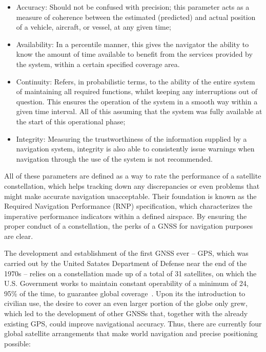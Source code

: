 \begin{itemize}
    \item Accuracy: Should not be confused with precision; this parameter acts as a measure of coherence between the estimated (predicted) and actual position of a vehicle, aircraft, or vessel, at any given time;
    \item Availability: In a percentile manner, this gives the navigator the ability to know the amount of time available to benefit from the services provided by the system, within a certain specified coverage area.
    \item Continuity: Refers, in probabilistic terms, to the ability of the entire system of maintaining all required functions, whilst keeping any interruptions out of question. This ensures the operation of the system in a smooth way within a given time interval. All of this assuming that the system was fully available at the start of this operational phase;
    \item Integrity: Measuring the trustworthiness of the information supplied by a navigation system, integrity is also able to consistently issue warnings when navigation through the use of the system is not recommended.
\end{itemize}
All of these parameters are defined as a way to rate the performance of a satellite constellation, which helps tracking down any discrepancies or even problems that might make accurate navigation unacceptable.
Their foundation is known as the Required Navigation Performance (RNP) specification, which characterizes the imperative performance indicators within a defined airspace. By ensuring the proper conduct of a constellation, the perks of a GNSS for navigation purposes are clear.

The development and establishment of the first GNSS ever -- GPS, which was carried out by the United Satates Department of Defense near the end of the 1970s -- relies on a constellation made up of a total of 31 satellites, on which the U.S. Government works to maintain constant operability of a minimum of 24, 95\% of the time, to guarantee global coverage~\cite{gps_USGov}.
Upon its the introduction to civilian use, the desire to cover an even larger portion of the globe only grew, which led to the development of other GNSSs that, together with the already existing GPS, could improve navigational accuracy. Thus, there are currently four global satellite arrangements that make world navigation and precise positioning possible:

